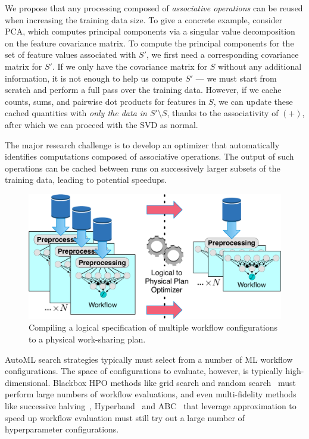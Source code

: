 \documentclass[11pt,dvipdfmx]{article}
\newcommand{\topic}[1]{\vspace{-3.5pt}\smallskip \smallskip \noindent{\bf #1.}}
\begin{document}
We propose that any processing composed of {\em associative operations} can be
reused when increasing the training data size. To give a concrete example,
consider PCA, which computes principal components via a singular value decomposition
on the feature covariance matrix. To compute the principal components for the set of feature values associated with $S'$,
we first need a corresponding covariance matrix for $S'$. If we only have the covariance matrix for $S$
without any additional information, it is not enough to help us compute $S'$ --- we must start from scratch
and perform a full pass over the training data. However, if we cache counts, sums, and pairwise dot products
for features in $S$, we can update these cached quantities with {\em only the data in $S'\setminus S$},
thanks to the associativity of $(+)$, after which we can proceed with the SVD as normal.

The major research challenge is to develop an optimizer that automatically identifies
computations composed of associative operations. The output of such operations can be cached between runs
on successively larger subsets of the training data, leading to potential speedups.


\begin{figure}
\vspace{-10pt}
    \centering
    \includegraphics[width=\linewidth]{figs/workshare.pdf}
    \vspace{-15pt}
    \caption{\footnotesize Compiling a logical specification of multiple workflow configurations to a physical work-sharing plan.}
    \label{fig:workshare}
    \vspace{-10pt}
\end{figure}
\topic{Work-Sharing Optimizations}
\label{sec:sharing}
AutoML search strategies typically must select from a number of ML workflow configurations.
The space of configurations to evaluate, however, is typically high-dimensional.
Blackbox HPO methods like
grid search and random search~\cite{bergstra2012random} must perform large
numbers of workflow evaluations, and even multi-fidelity methods
like successive halving~\cite{jamieson2016non}, Hyperband~\cite{li2016hyperband}
and ABC~\cite{huang2018efficient} that leverage approximation to speed up workflow evaluation
must still try out a large number of hyperparameter configurations.
\end{document}
